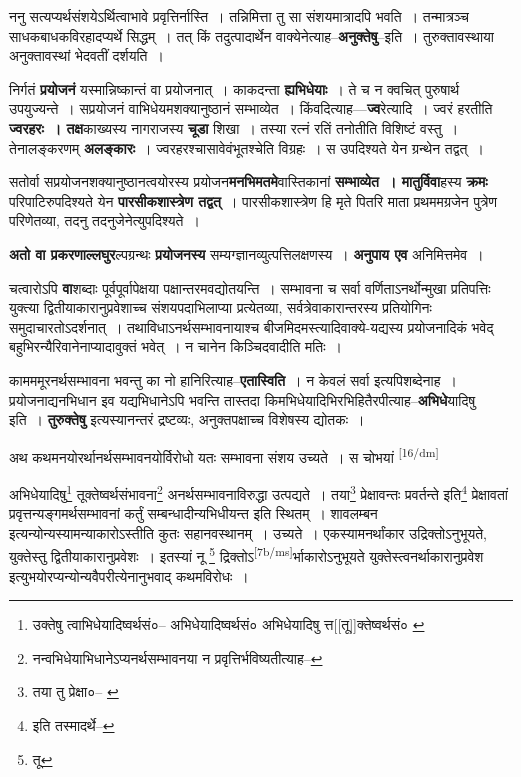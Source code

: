 \documentclass[article,12pt,a4paper]{memoir}
\begin{document}
	  \pstart ननु सत्यप्यर्थसंशयेऽर्थित्वाभावे प्रवृत्तिर्नास्ति । तन्निमित्ता तु सा संशयमात्रादपि भवति । तन्मात्रञ्च साधकबाधकविरहादप्यर्थे सिद्धम् । तत् किं तदुत्पादार्थेन वाक्येनेत्याह--\textbf{अनुक्तेषु}--इति । तुरुक्तावस्थाया अनुक्तावस्थां भेदवतीं दर्शयति ।
	\pend
      

	  \pstart निर्गतं \textbf{प्रयोजनं} यस्मान्निष्कान्तं वा प्रयोजनात् । काकदन्ता \textbf{ह्यभिधेयाः} । ते च न क्वचित् पुरुषार्थ उपयुज्यन्ते । सप्रयोजनं वाभिधेयमशक्यानुष्ठानं सम्भाव्येत । किंवदित्याह—\textbf{ज्व}रेत्यादि । ज्वरं हरतीति \textbf{ज्वरहरः । तक्ष}काख्यस्य नागराजस्य \textbf{चूडा} शिखा । तस्या रत्नं रतिं तनोतीति विशिष्टं वस्तु । तेनालङ्करणम् \textbf{अलङ्कारः} । ज्वरहरश्चासावेवंभूतश्चेति विग्रहः । स उपदिश्यते येन ग्रन्थेन तद्वत् ।
	\pend
      

	  \pstart सतोर्वा सप्रयोजनशक्यानुष्ठानत्वयोरस्य प्रयोजन\textbf{मनभिमतमे}वास्तिकानां \textbf{सम्भाव्येत । मातुर्विवा}हस्य \textbf{क्रमः} परिपाटिरुपदिश्यते येन \textbf{पारसीकशास्त्रेण तद्वत्} । पारसीकशास्त्रेण हि मृते पितरि माता प्रथममग्रजेन पुत्रेण परिणेतव्या, तदनु तदनुजेनेत्युपदिश्यते ।
	\pend
      

	  \pstart \textbf{अतो वा प्रकरणाल्लघुर}ल्पग्रन्थः \textbf{प्रयोजनस्य} सम्यग्ज्ञानव्युत्पत्तिलक्षणस्य । \textbf{अनुपाय एव} अनिमित्तमेव ।
	\pend
      

	  \pstart चत्वारोऽपि \textbf{वा}शब्दाः पूर्वपूर्वापेक्षया पक्षान्तरमवद्योतयन्ति । सम्भावना च सर्वा वर्णिताऽनर्थोन्मुखा प्रतिपत्तिः युक्त्या द्वितीयाकारानुप्रवेशाच्च संशयपदाभिलाप्या प्रत्येतव्या, सर्वत्रेवाकारान्तरस्य प्रतियोगिनः समुदाचारतोऽदर्शनात् । तथाविधाऽनर्थसम्भावनायाश्च बीजमिदमस्त्यादिवाक्ये-यद्यस्य प्रयोजनादिकं भवेद् बहुभिरन्यैरिवानेनाप्यादावुक्तं भवेत् । न चानेन किञ्चिदवादीति मतिः ।
	\pend
      

	  \pstart कामममूरनर्थसम्भावना भवन्तु का नो हानिरित्याह--\textbf{एतास्विति} । न केवलं सर्वा इत्यपिशब्देनाह । प्रयोजनाद्यनभिधान इव यद्यभिधानेऽपि भवन्ति तास्तदा किमभिधेयादिभिरभिहितैरपीत्याह--\textbf{अभिधे}यादिषु इति । \textbf{तुरुक्तेषु} इत्यस्यानन्तरं द्रष्टव्यः, अनुक्तपक्षाच्च विशेषस्य द्योतकः ।
	\pend
      

	  \pstart अथ कथमनयोरर्थानर्थसम्भावनयोर्विरोधो यतः सम्भावना संशय उच्यते । स चोभयां \leavevmode\textsuperscript{\rmlatinfont\tiny [16/dm]} 
	  
	अभिधेयादिषु\footnote{उक्तेषु त्वाभिधेयादिष्वर्थसं०--\cite{dp-edE} अभिधेयादिष्वर्थसं० \cite{dp-edH} \cite{dp-edP} अभिधेयादिषु त्त[[तू]]क्तेष्वर्थसं० \cite{dp-msB}} तूक्तेष्वर्थसंभावना\footnote{नन्वभिधेयाभिधानेऽप्यनर्थसम्भावनया न प्रवृत्तिर्भविष्यतीत्याह--\cite{dp-msD-n}} अनर्थसम्भावनाविरुद्धा उत्पद्यते । तया\footnote{तया तु प्रेक्षा०--\cite{dp-msA} \cite{dp-edP} \cite{dp-edH} \cite{dp-edN}} प्रेक्षावन्तः प्रवर्तन्ते इति\footnote{इति तस्मादर्थे--\cite{dp-msD-n}} प्रेक्षावतां प्रवृत्तन्यङ्गमर्थसम्भावनां कर्तुं सम्बन्धादीन्यभिधीयन्त इति स्थितम् । शावलम्बन इत्यन्योन्यस्यामन्याकारोऽस्तीति कुतः सहानवस्थानम् । उच्यते । एकस्यामनर्थांकार उद्रिक्तोऽनुभूयते, युक्तेस्तु द्वितीयाकारानुप्रवेशः । इतस्यां नू \footnote{तू} द्रिक्तोऽ\leavevmode\textsuperscript{\rmlatinfont\tiny [7b/ms]}र्भाकारोऽनुभूयते युक्तेस्त्वनर्थाकारानुप्रवेश इत्युभयोरप्यन्योन्यवैपरीत्येनानुभवाद् कथमविरोधः ।
	\pend
      
\end{document}
